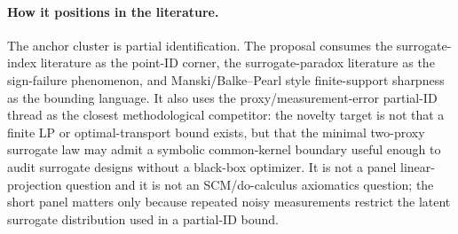 \documentclass[11pt]{article}
\theoremstyle{definition}
\theoremstyle{plain}
\theoremstyle{remark}
\begin{document}
\paragraph{How it positions in the literature.}
The anchor cluster is partial identification.  The proposal consumes the surrogate-index literature as the point-ID corner, the surrogate-paradox literature as the sign-failure phenomenon, and Manski/Balke--Pearl style finite-support sharpness as the bounding language.  It also uses the proxy/measurement-error partial-ID thread as the closest methodological competitor: the novelty target is not that a finite LP or optimal-transport bound exists, but that the minimal two-proxy surrogate law may admit a symbolic common-kernel boundary useful enough to audit surrogate designs without a black-box optimizer.  It is not a panel linear-projection question and it is not an SCM/do-calculus axiomatics question; the short panel matters only because repeated noisy measurements restrict the latent surrogate distribution used in a partial-ID bound.
\end{document}
